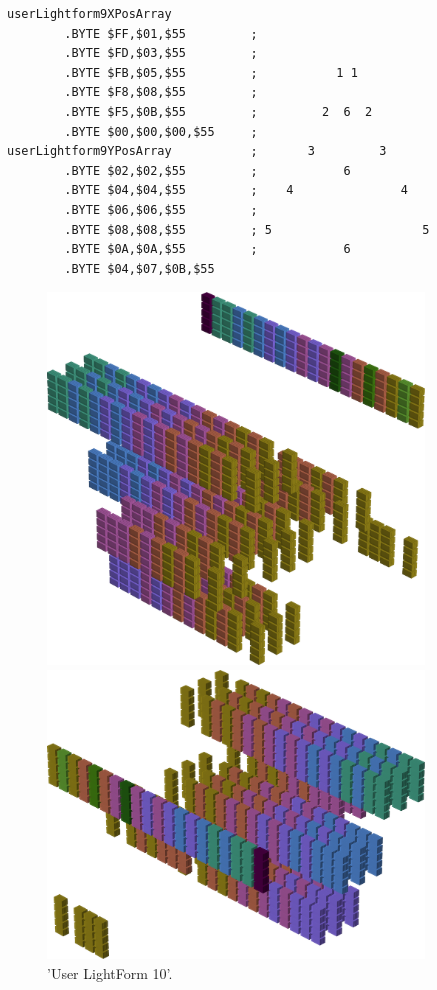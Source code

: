 \begin{lstlisting}
userLightform9XPosArray
        .BYTE $FF,$01,$55         ;                        
        .BYTE $FD,$03,$55         ;                        
        .BYTE $FB,$05,$55         ;           1 1          
        .BYTE $F8,$08,$55         ;                        
        .BYTE $F5,$0B,$55         ;         2  6  2        
        .BYTE $00,$00,$00,$55     ;                        
userLightform9YPosArray           ;       3         3      
        .BYTE $02,$02,$55         ;            6           
        .BYTE $04,$04,$55         ;    4               4   
        .BYTE $06,$06,$55         ;                        
        .BYTE $08,$08,$55         ; 5                     5
        .BYTE $0A,$0A,$55         ;            6           
        .BYTE $04,$07,$0B,$55
\end{lstlisting}


\begin{figure}[H]
    \centering
    \begin{adjustbox}{width=10cm,center}
      \includegraphics[width=10cm]{src/colorspace_patterns/pattern18-45.png}%
    \end{adjustbox}
    \begin{adjustbox}{width=10cm}
      \includegraphics[width=10cm]{src/colorspace_patterns/pattern18-225.png}%
    \end{adjustbox}
\caption{'User LightForm 10'.}
\end{figure}
\clearpage


